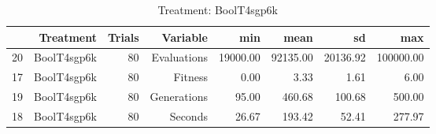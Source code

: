 \begin{table}[ht]
\centering
\begin{tabular}{rrrrrrrr}
  \hline
 & Treatment & Trials & Variable & min & mean & sd & max \\ 
  \hline
20 & BoolT4sgp6k &  80 & Evaluations & 19000.00 & 92135.00 & 20136.92 & 100000.00 \\ 
  17 & BoolT4sgp6k &  80 & Fitness & 0.00 & 3.33 & 1.61 & 6.00 \\ 
  19 & BoolT4sgp6k &  80 & Generations & 95.00 & 460.68 & 100.68 & 500.00 \\ 
  18 & BoolT4sgp6k &  80 & Seconds & 26.67 & 193.42 & 52.41 & 277.97 \\ 
   \hline
\end{tabular}
\caption{Treatment: BoolT4sgp6k} 
\end{table}
